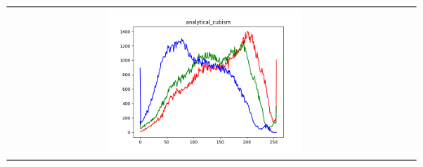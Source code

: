 \documentclass{article}
\begin{document}
\begin{center}
\begin{tabular}{cc}
				\includegraphics[width=0.5\textwidth]{plots/analytical_cubism.png}\par

			\end{tabular}
		\end{center}
		\newpage

		\begin{center}
			\begin{tabular}{cc}


\end{tabular}
\end{center}
\end{document}
